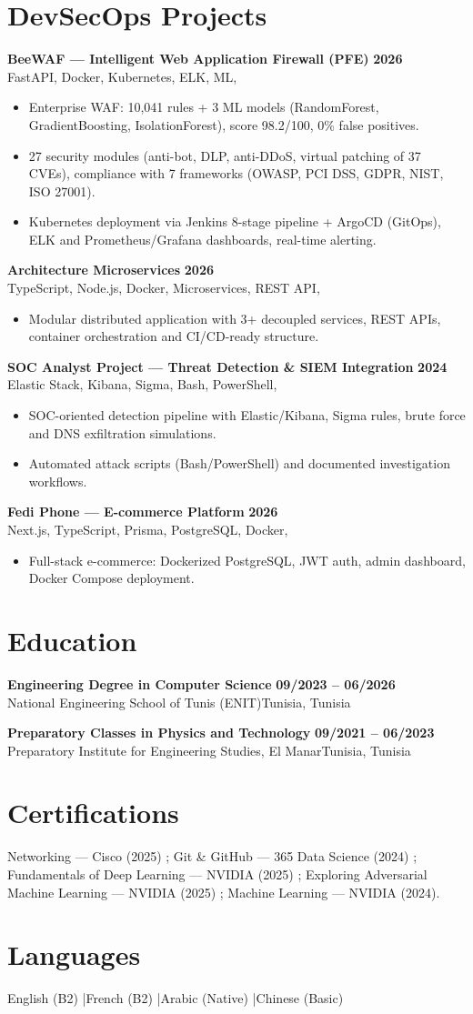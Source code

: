 \documentclass[a4paper,10pt]{article}
\newcommand{\cventry}[4]{\textbf{#1} \hfill \textbf{#4}\\[1pt]#2{\ifx\relax#3\relax\else, #3\fi}\par\vspace{2pt}}
\begin{document}
\section{DevSecOps Projects}
\cventry{BeeWAF — Intelligent Web Application Firewall (PFE)}{FastAPI, Docker, Kubernetes, ELK, ML}{}{2026}
\begin{itemize}
  \item Enterprise WAF: 10,041 rules + 3 ML models (RandomForest, GradientBoosting, IsolationForest), score 98.2/100, 0\% false positives.
  \item 27 security modules (anti-bot, DLP, anti-DDoS, virtual patching of 37 CVEs), compliance with 7 frameworks (OWASP, PCI DSS, GDPR, NIST, ISO 27001).
  \item Kubernetes deployment via Jenkins 8-stage pipeline + ArgoCD (GitOps), ELK and Prometheus/Grafana dashboards, real-time alerting.
\end{itemize}
\cventry{Architecture Microservices}{TypeScript, Node.js, Docker, Microservices, REST API}{}{2026}
\begin{itemize}
  \item Modular distributed application with 3+ decoupled services, REST APIs, container orchestration and CI/CD-ready structure.
\end{itemize}
\cventry{SOC Analyst Project — Threat Detection \& SIEM Integration}{Elastic Stack, Kibana, Sigma, Bash, PowerShell}{}{2024}
\begin{itemize}
  \item SOC-oriented detection pipeline with Elastic/Kibana, Sigma rules, brute force and DNS exfiltration simulations.
  \item Automated attack scripts (Bash/PowerShell) and documented investigation workflows.
\end{itemize}
\cventry{Fedi Phone — E-commerce Platform}{Next.js, TypeScript, Prisma, PostgreSQL, Docker}{}{2026}
\begin{itemize}
  \item Full-stack e-commerce: Dockerized PostgreSQL, JWT auth, admin dashboard, Docker Compose deployment.
\end{itemize}
\section{Education}
\cventry{Engineering Degree in Computer Science}{National Engineering School of Tunis (ENIT)}{Tunisia}{09/2023 -- 06/2026}
\cventry{Preparatory Classes in Physics and Technology}{Preparatory Institute for Engineering Studies, El Manar}{Tunisia}{09/2021 -- 06/2023}
\section{Certifications}
Networking — Cisco (2025) ; Git \& GitHub — 365 Data Science (2024) ; Fundamentals of Deep Learning — NVIDIA (2025) ; Exploring Adversarial Machine Learning — NVIDIA (2025) ; Machine Learning — NVIDIA (2024).
\section{Languages}
English (B2) \quad|\quad French (B2) \quad|\quad Arabic (Native) \quad|\quad Chinese (Basic)
\end{document}
